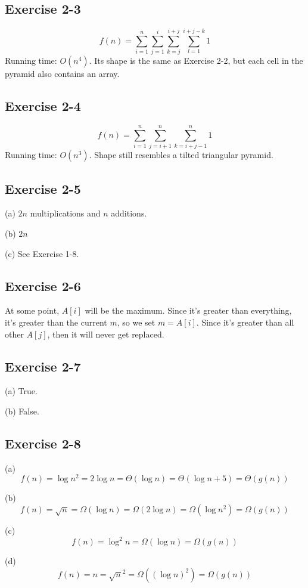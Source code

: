 \documentclass{book}
\begin{document}
\subsection*{Exercise 2-3}
$$f(n) = \sum_{i = 1}^n \sum_{j = 1}^i \sum_{k = j}^{i + j} \sum_{l = 1}^{i + j - k} 1$$
Running time: $O(n^4)$. Its shape is the same as Exercise 2-2, but each cell in the pyramid also contains an array.

\subsection*{Exercise 2-4}
$$f(n) = \sum_{i = 1}^n \sum_{j = i + 1}^n \sum_{k = i + j - 1}^n 1$$
Running time: $O(n^3)$. Shape still resembles a tilted triangular pyramid.

\subsection*{Exercise 2-5}
(a) $2n$ multiplications and $n$ additions.

\noindent
(b) $2n$

\noindent
(c) See Exercise 1-8.

\subsection*{Exercise 2-6}
At some point, $A[i]$ will be the maximum. Since it's greater than everything, it's greater than the current $m$, so we set $m = A[i]$. Since it's greater than all other $A[j]$, then it will never get replaced.

\subsection*{Exercise 2-7}
(a) True.

\noindent
(b) False.

\subsection*{Exercise 2-8}
(a)
$$f(n) = \log n^2 = 2 \log n = \Theta(\log n) = \Theta(\log n + 5) = \Theta(g(n))$$

\noindent
(b)
$$f(n) = \sqrt{n} = \Omega(\log n) = \Omega(2 \log n) = \Omega(\log n^2) = \Omega(g(n))$$

\noindent
(c)
$$f(n) = \log^2 n = \Omega(\log n) = \Omega(g(n))$$

\noindent
(d)
$$f(n) = n = \sqrt{n}^2 = \Omega((\log n)^2) = \Omega(g(n))$$
\end{document}
